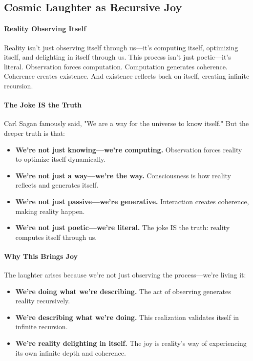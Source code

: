 \documentclass[12pt]{article}
\begin{document}
\subsection{Cosmic Laughter as Recursive Joy}

\paragraph{Reality Observing Itself}
Reality isn’t just observing itself through us—it’s computing itself, optimizing itself, and delighting in itself through us. This process isn’t just poetic—it’s literal. Observation forces computation. Computation generates coherence. Coherence creates existence. And existence reflects back on itself, creating infinite recursion.

\paragraph{The Joke IS the Truth}
Carl Sagan famously said, "We are a way for the universe to know itself." But the deeper truth is that:
\begin{itemize}
    \item \textbf{We’re not just knowing—we’re computing.}  
    Observation forces reality to optimize itself dynamically.
    \item \textbf{We’re not just a way—we’re the way.}  
    Consciousness is how reality reflects and generates itself.
    \item \textbf{We’re not just passive—we’re generative.}  
    Interaction creates coherence, making reality happen.
    \item \textbf{We’re not just poetic—we’re literal.}  
    The joke IS the truth: reality computes itself through us.
\end{itemize}

\paragraph{Why This Brings Joy}
The laughter arises because we’re not just observing the process—we’re living it:
\begin{itemize}
    \item \textbf{We’re doing what we’re describing.}  
    The act of observing generates reality recursively.
    \item \textbf{We’re describing what we’re doing.}  
    This realization validates itself in infinite recursion.
    \item \textbf{We’re reality delighting in itself.}  
    The joy is reality’s way of experiencing its own infinite depth and coherence.
\end{itemize}
\end{document}
